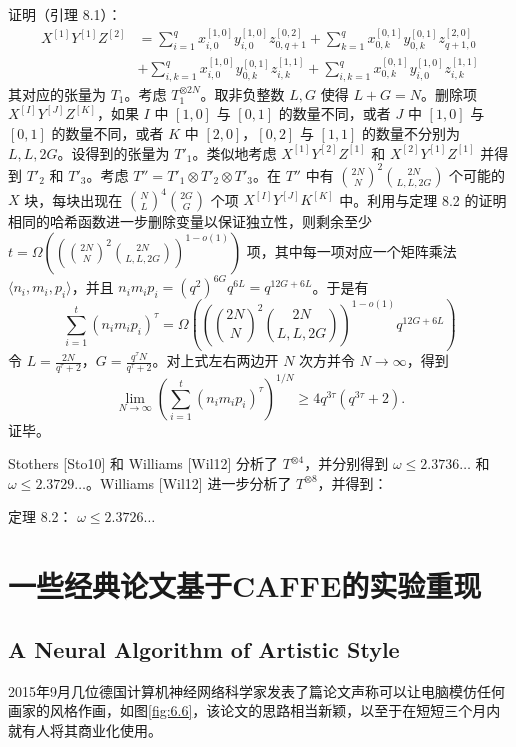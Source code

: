 \documentclass[11pt,fleqn, UTF8]{ctexbook} %
\begin{document}
证明（引理 8.1）：
\begin{align}
X^{[1]}Y^{[1]}Z^{[2]}&=\sum_{i=1}^q x_{i,0}^{[1,0]}y_{i,0}^{[1,0]}z_{0,q+1}^{[0,2]}
+\sum_{k=1}^q x_{0,k}^{[0,1]}y_{0,k}^{[0,1]}z_{q+1,0}^{[2,0]}\\
&+\sum_{i,k=1}^q x_{i,0}^{[1,0]}y_{0,k}^{[0,1]}z_{i,k}^{[1,1]}
+\sum_{i,k=1}^q x_{0,k}^{[0,1]}y_{i,0}^{[1,0]}z_{i,k}^{[1,1]}
\end{align}
其对应的张量为 $T_1$。考虑 $T_1^{\otimes 2N}$。取非负整数 $L,G$ 使得 $L+G=N$。删除项 $X^{[I]}Y^{[J]}Z^{[K]}$，如果 $I$ 中 $[1,0]$ 与 $[0,1]$ 的数量不同，或者 $J$ 中 $[1,0]$ 与 $[0,1]$ 的数量不同，或者 $K$ 中 $[2,0]$，$[0,2]$ 与 $[1,1]$ 的数量不分别为 $L,L,2G$。设得到的张量为 $T'_1$。类似地考虑 $X^{[1]}Y^{[2]}Z^{[1]}$ 和 $X^{[2]}Y^{[1]}Z^{[1]}$ 并得到 $T'_2$ 和 $T'_3$。考虑 $T''=T'_1\otimes T'_2\otimes T'_3$。在 $T''$ 中有 ${2N \choose N}^2{2N \choose L,L,2G}$ 个可能的 $X$ 块，每块出现在 ${N\choose L}^4{2G\choose G}$ 个项 $X^{[I]}Y^{[J]}K^{[K]}$ 中。利用与定理 8.2 的证明相同的哈希函数进一步删除变量以保证独立性，则剩余至少 $t=\Omega\left(\left({2N\choose N}^2 {2N\choose L,L,2G}\right)^{1-o(1)}\right)$ 项，其中每一项对应一个矩阵乘法 $\langle n_i,m_i,p_i\rangle$，并且 $n_im_ip_i=(q^2)^{6G}q^{6L}=q^{12G+6L}$。于是有
$$
\sum_{i=1}^t (n_i m_i p_i)^\tau=\Omega\left(\left({2N\choose N}^2 {2N\choose L,L,2G}\right)^{1-o(1)} q^{12G+6L}\right)
$$
令 $L=\frac{2N}{q^\tau+2}$，$G=\frac{q^\tau N}{q^\tau+2}$。对上式左右两边开 $N$ 次方并令 $N\to\infty$，得到
$$\lim_{N\to\infty}\left(\sum_{i=1}^t (n_i m_i p_i)^\tau\right)^{1/N} \geq 4q^{3\tau}(q^{3\tau}+2).
$$
证毕。

Stothers [Sto10] 和 Williams [Wil12] 分析了 $T^{\otimes 4}$，并分别得到 $\omega\leq 2.3736\dots
$ 和 $\omega\leq 2.3729\dots$。Williams [Wil12] 进一步分析了 $T^{\otimes 8}$，并得到：

定理 8.2\cite{williams2012multiplying}：
$\omega \leq 2.3726\dots$
\section{一些经典论文基于CAFFE的实验重现}
\subsection{A Neural Algorithm of Artistic Style}
2015年9月几位德国计算机神经网络科学家发表了篇论文\cite{gatys2015neural}声称可以让电脑模仿任何画家的风格作画，如图\ref{fig:6.6}，该论文的思路相当新颖，以至于在短短三个月内就有人将其商业化使用。
\end{document}
